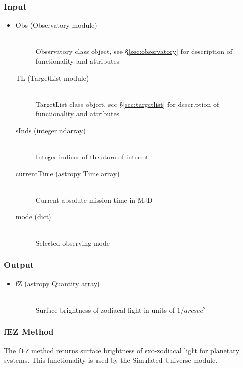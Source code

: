 \documentclass[cleanfoot]{asme2ej}
\begin{document}
\subsubsection*{Input}
\begin{itemize}
\item 
\begin{description}
    \item[Obs (Observatory module)] \hfill \\ Observatory class object, see \S\ref{sec:observatory} for description of functionality and attributes       
    \item[TL (TargetList module)] \hfill \\ TargetList class object, see \S\ref{sec:targetlist} for description of functionality and attributes       
    \item[sInds (integer ndarray)] \hfill \\ Integer indices of the stars of interest
    \item[currentTime (astropy \href{http://astropy.readthedocs.org/en/latest/time/index.html}{Time} array)] \hfill \\ Current absolute mission time in MJD    
    \item[mode (dict)] \hfill \\ Selected observing mode
\end{description}
\end{itemize}

\subsubsection*{Output}
\begin{itemize}
\item 
\begin{description}
    \item[fZ (astropy Quantity array)] \hfill \\ Surface brightness of zodiacal light in units of $ 1/arcsec^2 $
\end{description}
\end{itemize}

\subsubsection{fEZ Method} \label{sec:fEZtask}
The \verb+fEZ+ method returns surface brightness of exo-zodiacal light for planetary systems.  This functionality is used by the Simulated Universe module.
\end{document}
